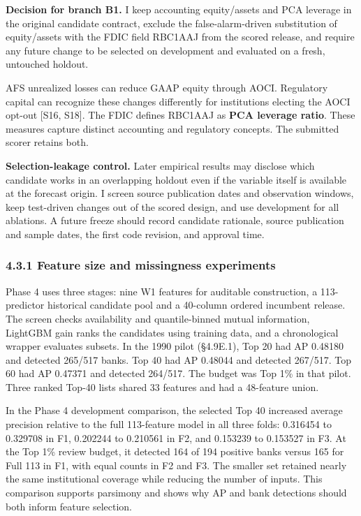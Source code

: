 \documentclass[
  12pt,
  a4paper,
]{article}
\begin{document}
\textbf{Decision for branch B1.} I keep accounting equity/assets and PCA
leverage in the original candidate contract, exclude the
false-alarm-driven substitution of equity/assets with the FDIC field
RBC1AAJ from the scored release, and require any future change to be
selected on development and evaluated on a fresh, untouched holdout.

AFS unrealized losses can reduce GAAP equity through AOCI. Regulatory
capital can recognize these changes differently for institutions
electing the AOCI opt-out {[}S16, S18{]}. The FDIC defines RBC1AAJ as
\textbf{PCA leverage ratio}. These measures capture distinct accounting
and regulatory concepts. The submitted scorer retains both.

\textbf{Selection-leakage control.} Later empirical results may disclose
which candidate works in an overlapping holdout even if the variable
itself is available at the forecast origin. I screen source publication
dates and observation windows, keep test-driven changes out of the
scored design, and use development for all ablations. A future freeze
should record candidate rationale, source publication and sample dates,
the first code revision, and approval time.

\subsubsection{4.3.1 Feature size and missingness
experiments}\label{feature-size-and-missingness-experiments}

Phase 4 uses three stages: nine W1 features for auditable construction,
a 113-predictor historical candidate pool and a 40-column ordered
incumbent release. The screen checks availability and quantile-binned
mutual information, LightGBM gain ranks the candidates using training
data, and a chronological wrapper evaluates subsets. In the 1990 pilot
(§4.9E.1), Top 20 had AP 0.48180 and detected 265/517 banks. Top 40 had
AP 0.48044 and detected 267/517. Top 60 had AP 0.47371 and detected
264/517. The budget was Top 1\% in that pilot. Three ranked Top-40 lists
shared 33 features and had a 48-feature union.

In the Phase 4 development comparison, the selected Top 40 increased
average precision relative to the full 113-feature model in all three
folds: 0.316454 to 0.329708 in F1, 0.202244 to 0.210561 in F2, and
0.153239 to 0.153527 in F3. At the Top 1\% review budget, it detected
164 of 194 positive banks versus 165 for Full 113 in F1, with equal
counts in F2 and F3. The smaller set retained nearly the same
institutional coverage while reducing the number of inputs. This
comparison supports parsimony and shows why AP and bank detections
should both inform feature selection.
\end{document}
